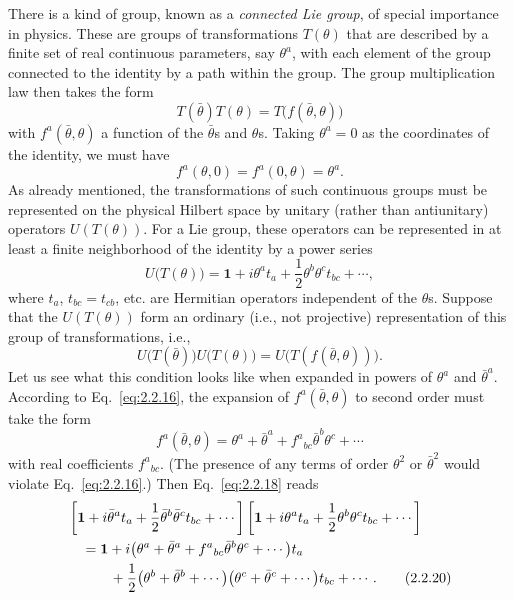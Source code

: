 There is a kind of group, known as a \emph{connected Lie group}, of
special importance in physics. These are groups of transformations
$T(\theta)$ that are described by a finite set of real continuous
parameters, say $\theta^a$, with each element of the group connected to
the identity by a path within the group. The group multiplication law then
takes the form
\begin{equation}
  T(\bar\theta)T(\theta)=T\bigl(f(\bar\theta,\theta)\bigr)
  \tag{2.2.15}\label{eq:2.2.15}
\end{equation}
with $f^a(\bar\theta,\theta)$ a function of the $\bar\theta$s and $\theta$s.
Taking $\theta^a=0$ as the coordinates of the identity, we must have
\begin{equation}
  f^a(\theta,0)=f^a(0,\theta)=\theta^a.
  \tag{2.2.16}\label{eq:2.2.16}
\end{equation}
As already mentioned, the transformations of such continuous groups must
be represented on the physical Hilbert space by unitary (rather than
antiunitary) operators $U(T(\theta))$. For a Lie group, these operators can
be represented in at least a finite neighborhood of the identity by a
power series
\begin{equation}
  U\bigl(T(\theta)\bigr)
    =\mathbf{1}+i\theta^a t_a+\frac{1}{2}\theta^b\theta^c t_{bc}+\cdots,
  \tag{2.2.17}\label{eq:2.2.17}
\end{equation}
where $t_a$, $t_{bc}=t_{cb}$, etc. are Hermitian operators independent of
the $\theta$s. Suppose that the $U(T(\theta))$ form an ordinary (i.e., not
projective) representation of this group of transformations, i.e.,
\begin{equation}
  U\bigl(T(\bar\theta)\bigr)U\bigl(T(\theta)\bigr)
    =U\bigl(T(f(\bar\theta,\theta))\bigr).
  \tag{2.2.18}\label{eq:2.2.18}
\end{equation}
Let us see what this condition looks like when expanded in powers of
$\theta^a$ and $\bar\theta^a$. According to Eq.~\eqref{eq:2.2.16}, the expansion of
$f^a(\bar\theta,\theta)$ to second order must take the form
\begin{equation}
  f^a(\bar\theta,\theta)
    =\theta^a+\bar\theta^a+f^a{}_{bc}\bar\theta^b\theta^c+\cdots
  \tag{2.2.19}\label{eq:2.2.19}
\end{equation}
with real coefficients $f^a{}_{bc}$. (The presence of any terms of order
$\theta^2$ or $\bar\theta^2$ would violate Eq.~\eqref{eq:2.2.16}.) Then
Eq.~\eqref{eq:2.2.18} reads
\begin{align}
  &\left[\mathbf{1}+i\bar\theta^a t_a
    +\frac{1}{2}\bar\theta^b\bar\theta^c t_{bc}+\cdots\right]
  \left[\mathbf{1}+i\theta^a t_a
    +\frac{1}{2}\theta^b\theta^c t_{bc}+\cdots\right]
  \notag\\
  &\quad=\mathbf{1}
    +i\bigl(\theta^a+\bar\theta^a
      +f^a{}_{bc}\bar\theta^b\theta^c+\cdots\bigr)t_a
  \notag\\
  &\qquad\quad
    +\frac{1}{2}\bigl(\theta^b+\bar\theta^b+\cdots\bigr)
      \bigl(\theta^c+\bar\theta^c+\cdots\bigr)t_{bc}+\cdots.
  \tag{2.2.20}\label{eq:2.2.20}
\end{align}

